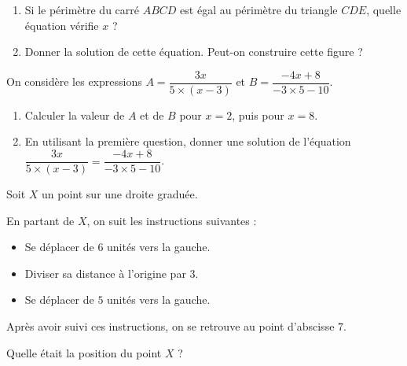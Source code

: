 \documentclass[
	classe=$2^{de}$,
	headerTitle=Évaluation\space Chapitre\space 1,
	surFeuille
]{évaluation}
\begin{document}
\begin{exercice}
	\begin{center}
	\end{center}

	\begin{enumerate}
		\item Si le périmètre du carré $ABCD$ est égal au périmètre du triangle $CDE$, quelle équation vérifie $x$ ? %
		\item Donner la solution de cette équation. %
		      Peut-on construire cette figure ? %
	\end{enumerate}
\end{exercice}

\begin{exercice}
	On considère les expressions $A = \dfrac{3x}{5 × (x - 3)}$ et $B = \dfrac{-4x + 8}{-3 × 5 - 10}$.
	\begin{enumerate}
		\item Calculer la valeur de $A$ et de $B$ pour $x = 2$, puis pour $x = 8$. %
		\item En utilisant la première question, donner une solution de l'équation $\dfrac{3x}{5 × (x - 3)} = \dfrac{-4x + 8}{-3 × 5 - 10}$.
	\end{enumerate}
\end{exercice}

\begin{exercice}
	Soit $X$ un point sur une droite graduée.

	En partant de $X$, on suit les instructions suivantes :
	\begin{itemize}
		\item Se déplacer de $6$ unités vers la gauche.
		\item Diviser sa distance à l'origine par $3$.
		\item Se déplacer de $5$ unités vers la gauche.
	\end{itemize}

	Après avoir suivi ces instructions, on se retrouve au point d'abscisse $7$.

	Quelle était la position du point $X$ ?
\end{exercice}
\end{document}
